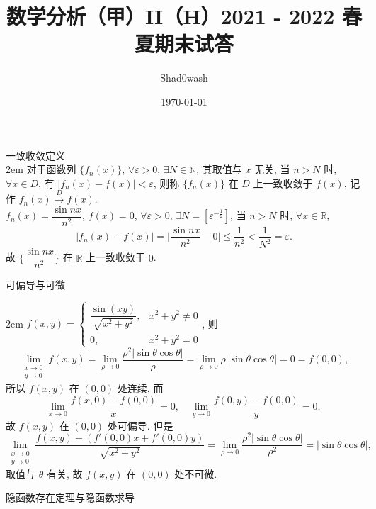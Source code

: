 \documentclass[UTF8,14pt,normal]{ctexart}
\title{数学分析（甲）II（H）2021 - 2022 春夏期末试答}
\author{Shad0wash}
\date{\today}
\begin{document}
\maketitle

 一致收敛定义 \\

    \hangindent 2em
    \noindent
    对于函数列 \(\{f_n(x)\}\), \(\forall \varepsilon > 0\), \(\exists N \in \mathbb{N}\), 其取值与 \(x\) 无关, 当 \(n > N\) 时, \(\forall x \in D\), 有 \(\lvert f_n(x) - f(x) \rvert < \varepsilon\), 则称 \(\{f_n(x)\}\) 在 \(D\) 上一致收敛于 \(f(x)\), 记作 \(f_n(x) \xrightarrow{D} f(x)\). \\
    \(f_n(x) = \dfrac{\sin nx}{n^2}\), \(f(x) = 0\), \(\forall \varepsilon > 0\), \(\exists N = \left[ \varepsilon^{-\frac{1}{2}} \right]\), 当 \(n > N\) 时, \(\forall x \in \mathbb{R}\), 
    \[
        \lvert f_n(x) - f(x) \rvert = \lvert \dfrac{\sin nx}{n^2} - 0 \rvert \leqslant \dfrac{1}{n^2} < \dfrac{1}{N^2} = \varepsilon.
    \]
    故 \(\{ \dfrac{\sin nx}{n^2} \}\) 在 \(\mathbb{R}\) 上一致收敛于 \(0\). 

 可偏导与可微

    \hangindent 2em
    \noindent
    \(f(x, y) = \begin{cases} \dfrac{\sin (xy)}{\sqrt{x^2 + y^2}}, & x^2 + y^2 \neq 0 \\ 0, & x^2 + y^2 = 0 \end{cases}\), 则
    \[
        \lim_{\substack{x \to 0 \\ y \to 0}} f(x, y) = \lim_{\rho \to 0} \dfrac{\rho^2 \lvert \sin \theta \cos \theta \rvert}{\rho} = \lim_{\rho \to 0} \rho \lvert \sin \theta \cos \theta \rvert = 0 = f(0, 0),
    \]
    所以 \(f(x, y)\) 在 \((0, 0)\) 处连续. 而
    \[
        \lim_{x \to 0} \dfrac{f(x, 0) - f(0, 0)}{x} = 0, \quad \lim_{y \to 0} \dfrac{f(0, y) - f(0, 0)}{y} = 0,
    \]
    故 \(f(x, y)\) 在 \((0, 0)\) 处可偏导. 但是
    \[
        \lim_{\substack{x \to 0 \\ y \to 0}} \dfrac{f(x, y) - (f'(0, 0) x + f'(0, 0) y)}{\sqrt{x^2 + y^2}} = \lim_{\rho \to 0} \dfrac{\rho^2 \lvert \sin \theta \cos \theta \rvert }{\rho^2} = \lvert \sin \theta \cos \theta \rvert,
    \]
    取值与 \(\theta\) 有关, 故 \(f(x, y)\) 在 \((0, 0)\) 处不可微.


 隐函数存在定理与隐函数求导
\end{document}
